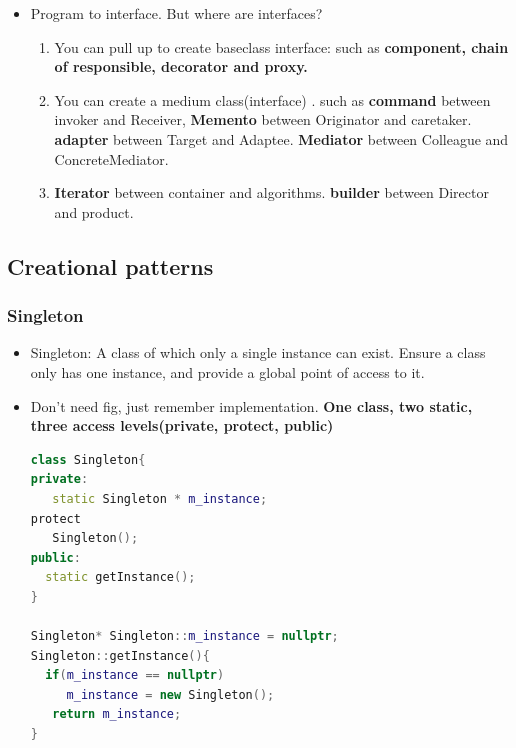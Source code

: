 \documentclass[a4paper,12pt,twoside]{book}
\begin{document}
\begin{itemize}
\item Program to interface. But where are interfaces?  
\begin{enumerate}
\item You can pull up to create baseclass interface: such as \textbf{component, chain of responsible, decorator and proxy.}  
\item You can create a medium class(interface) . such as \textbf{command} between invoker and Receiver, \textbf{Memento} between Originator and caretaker.  \textbf{adapter} between Target and Adaptee. \textbf{Mediator} between Colleague and ConcreteMediator. 
\item \textbf{Iterator} between container and algorithms. \textbf{builder} between Director and product.  
\end{enumerate}


\end{itemize}

\subsection{Creational patterns}
\subsubsection{Singleton}
\begin{itemize}
\item Singleton: A class of which only a single instance can exist. Ensure a class only has one instance, and provide a global point of access to it.

\item Don't need fig, just remember implementation.  \textbf{One class, two static, three access levels(private, protect, public) }  
\begin{lstlisting}[frame=single, language=c++]
class Singleton{
private:
   static Singleton * m_instance;
protect
   Singleton();
public:
  static getInstance(); 
}

Singleton* Singleton::m_instance = nullptr;
Singleton::getInstance(){
  if(m_instance == nullptr)
     m_instance = new Singleton();
   return m_instance;
}
\end{lstlisting}


\end{itemize}
\end{document}
